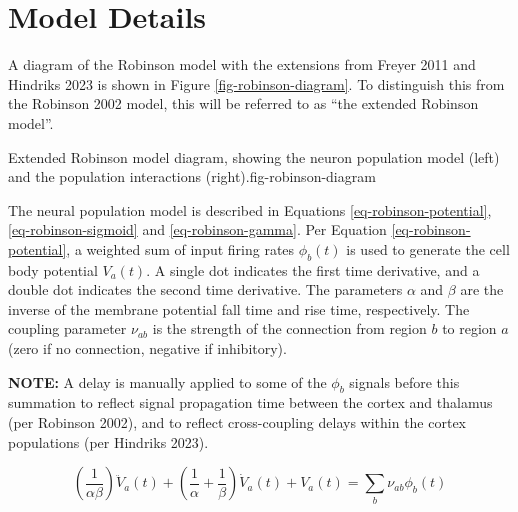 
\chapter{Model Details}
\label{sect-robinson-model}

A diagram of the Robinson model with the extensions from Freyer 2011 and
Hindriks 2023 is shown in Figure \ref{fig-robinson-diagram}. To distinguish
this from the Robinson 2002 model, this will be referred to as ``the
extended Robinson model''.

{Extended Robinson model diagram, showing the neuron population model
(left) and the population interactions (right).}{fig-robinson-diagram}

The neural population model is described in Equations
\ref{eq-robinson-potential}, \ref{eq-robinson-sigmoid} and
\ref{eq-robinson-gamma}.
%
Per Equation \ref{eq-robinson-potential}, a weighted sum of input firing
rates $\phi_b(t)$ is used to generate the cell body potential $V_a(t)$. A
single dot indicates the first time derivative, and a double dot indicates
the second time derivative. The parameters $\alpha$ and $\beta$ are the
inverse of the membrane potential fall time and rise time, respectively.
The coupling parameter $\nu_{ab}$ is the strength of the connection from
region $b$ to region $a$ (zero if no connection, negative if inhibitory).

\textbf{NOTE:} A delay is manually applied to some of the $\phi_b$ signals
before this summation to reflect signal propagation time between the cortex
and thalamus (per Robinson 2002), and to reflect cross-coupling delays
within the cortex populations (per Hindriks 2023).

\begin{equation}
\left ( \frac{1}{\alpha \beta} \right ) \ddot{V}_a(t)
+ \left ( \frac{1}{\alpha} + \frac{1}{\beta} \right ) \dot{V}_a(t)
+ V_a(t) = \sum_b \nu_{ab} \phi_b(t)
\label{eq-robinson-potential}
\end{equation}

